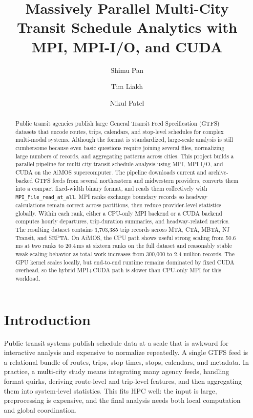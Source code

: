 \documentclass[sigconf,nonacm]{acmart}
\title{Massively Parallel Multi-City Transit Schedule Analytics with MPI, MPI-I/O, and CUDA}
\author{Shimu Pan}
\affiliation{%
  \institution{Rensselaer Polytechnic Institute}
  \city{Troy}
  \state{New York}
  \country{USA}
}
\author{Tim Liakh}
\affiliation{%
  \institution{Rensselaer Polytechnic Institute}
  \city{Troy}
  \state{New York}
  \country{USA}
}
\author{Nikul Patel}
\affiliation{%
  \institution{Rensselaer Polytechnic Institute}
  \city{Troy}
  \state{New York}
  \country{USA}
}
\begin{document}
\begin{abstract}
Public transit agencies publish large General Transit Feed Specification (GTFS) datasets that encode routes, trips, calendars, and stop-level schedules for complex multi-modal systems. Although the format is standardized, large-scale analysis is still cumbersome because even basic questions require joining several files, normalizing large numbers of records, and aggregating patterns across cities. This project builds a parallel pipeline for multi-city transit schedule analysis using MPI, MPI-I/O, and CUDA on the AiMOS supercomputer. The pipeline downloads current and archive-backed GTFS feeds from several northeastern and midwestern providers, converts them into a compact fixed-width binary format, and reads them collectively with \texttt{MPI\_File\_read\_at\_all}. MPI ranks exchange boundary records so headway calculations remain correct across partitions, then reduce provider-level statistics globally. Within each rank, either a CPU-only MPI backend or a CUDA backend computes hourly departures, trip-duration summaries, and headway-related metrics. The resulting dataset contains 3,703,385 trip records across MTA, CTA, MBTA, NJ Transit, and SEPTA. On AiMOS, the CPU path shows useful strong scaling from 50.6\,ms at two ranks to 20.4\,ms at sixteen ranks on the full dataset and reasonably stable weak-scaling behavior as total work increases from 300,000 to 2.4 million records. The GPU kernel scales locally, but end-to-end runtime remains dominated by fixed CUDA overhead, so the hybrid MPI+CUDA path is slower than CPU-only MPI for this workload.
\end{abstract}


\maketitle

\section{Introduction}
Public transit systems publish schedule data at a scale that is awkward for interactive analysis and expensive to normalize repeatedly. A single GTFS feed is a relational bundle of routes, trips, stop times, stops, calendars, and metadata. In practice, a multi-city study means integrating many agency feeds, handling format quirks, deriving route-level and trip-level features, and then aggregating them into system-level statistics. This fits HPC well: the input is large, preprocessing is expensive, and the final analysis needs both local computation and global coordination.
\end{document}
